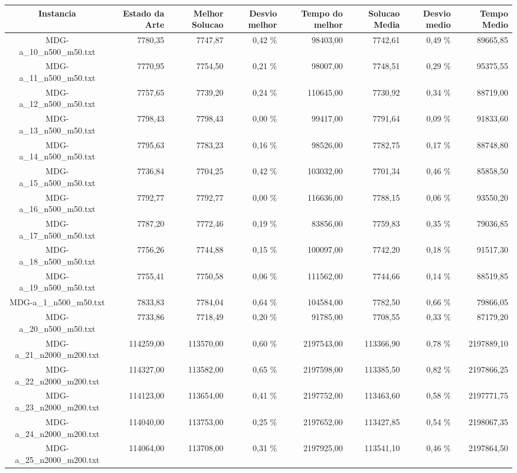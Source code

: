 \begin{landscape}
	\begin{table}[ht]
	\centering
	\begin{tabular}{| c | r | r | r | r | r | r | r |  }
\hline
Instancia&Estado da Arte&Melhor Solucao&Desvio melhor&Tempo do melhor&Solucao Media&Desvio medio&Tempo Medio\\ \hline 
		MDG-a\_10\_n500\_m50.txt&7780,35&7747,87&0,42 \%&98403,00&7742,61&0,49 \%&89665,85\\
		MDG-a\_11\_n500\_m50.txt&7770,95&7754,50&0,21 \%&98007,00&7748,51&0,29 \%&95375,55\\
		MDG-a\_12\_n500\_m50.txt&7757,65&7739,20&0,24 \%&110645,00&7730,92&0,34 \%&88719,00\\
		MDG-a\_13\_n500\_m50.txt&7798,43&7798,43&0,00 \%&99417,00&7791,64&0,09 \%&91833,60\\
		MDG-a\_14\_n500\_m50.txt&7795,63&7783,23&0,16 \%&98526,00&7782,75&0,17 \%&88748,80\\
		MDG-a\_15\_n500\_m50.txt&7736,84&7704,25&0,42 \%&103032,00&7701,34&0,46 \%&85858,50\\
		MDG-a\_16\_n500\_m50.txt&7792,77&7792,77&0,00 \%&116636,00&7788,15&0,06 \%&93550,20\\
		MDG-a\_17\_n500\_m50.txt&7787,20&7772,46&0,19 \%&83856,00&7759,83&0,35 \%&79036,85\\
		MDG-a\_18\_n500\_m50.txt&7756,26&7744,88&0,15 \%&100097,00&7742,20&0,18 \%&91517,30\\
		MDG-a\_19\_n500\_m50.txt&7755,41&7750,58&0,06 \%&111562,00&7744,66&0,14 \%&88519,85\\
		MDG-a\_1\_n500\_m50.txt&7833,83&7784,04&0,64 \%&104584,00&7782,50&0,66 \%&79866,05\\
		MDG-a\_20\_n500\_m50.txt&7733,86&7718,49&0,20 \%&91785,00&7708,55&0,33 \%&87179,20\\
		MDG-a\_21\_n2000\_m200.txt&114259,00&113570,00&0,60 \%&2197543,00&113366,90&0,78 \%&2197889,10\\
		MDG-a\_22\_n2000\_m200.txt&114327,00&113582,00&0,65 \%&2197598,00&113385,50&0,82 \%&2197866,25\\
		MDG-a\_23\_n2000\_m200.txt&114123,00&113654,00&0,41 \%&2197752,00&113463,60&0,58 \%&2197771,75\\
		MDG-a\_24\_n2000\_m200.txt&114040,00&113753,00&0,25 \%&2197652,00&113427,85&0,54 \%&2198067,35\\
		MDG-a\_25\_n2000\_m200.txt&114064,00&113708,00&0,31 \%&2197925,00&113541,10&0,46 \%&2197864,50\\

\end{tabular}
\end{table}
\end{landscape}
